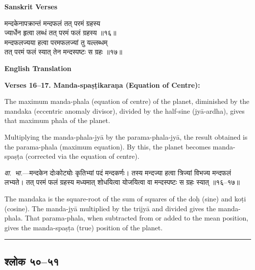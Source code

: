 \documentclass[11pt,a4paper]{article}
\newcommand{\longline}{\noindent\rule{\textwidth}{0.4pt}}
\newcommand{\dev}[1]{{\devanagarifont #1}}
\newcommand{\sectsep}{\par\vspace{0.8em}\longline\vspace{0.8em}}
\begin{document}
\begin{minipage}[t]{0.48\textwidth}
\textbf{\small Sanskrit Verses}

\small\devanagarifont
मन्दकेनापक्रान्तं मन्दफलं तत् परमं ग्रहस्य\\
ज्यार्धेन हृत्वा लब्धं तत् परमं फलं ग्रहस्य ॥१६॥\\[0.5em]
मन्दफलज्यया हत्वा परमफलज्यां तु यल्लब्धम्\\
तत् परमं फलं स्यात् तेन मन्दस्पष्टः स ग्रहः ॥१७॥
\end{minipage}%
\hfill
\begin{minipage}[t]{0.48\textwidth}
\textbf{\small English Translation}

\textbf{Verses 16--17. Manda-spa\d{s}\d{t}ikara\d{n}a (Equation of Centre):}

The maximum manda-phala (equation of centre) of the planet, diminished by the mandaka (eccentric anomaly divisor), divided by the half-sine (jy\=a-ardha), gives that maximum phala of the planet.

Multiplying the manda-phala-jy\=a by the parama-phala-jy\=a, the result obtained is the parama-phala (maximum equation). By this, the planet becomes manda-spa\d{s}\d{t}a (corrected via the equation of centre).
\end{minipage}

\vspace{0.5em}
\begin{minipage}[t]{0.48\textwidth}
\small\devanagarifont
\textit{वा.~भा.}---मन्दकेन दोःकोट्योः कृतिभ्यां पदं मन्दकर्णः। तस्य मन्दज्या हत्वा त्रिज्यां विभज्य मन्दफलं लभ्यते। तत् परमं फलं ग्रहस्य मध्यमात् शोधयित्वा योजयित्वा वा मन्दस्पष्टः स ग्रहः स्यात् ॥१६--१७॥
\end{minipage}%
\hfill
\begin{minipage}[t]{0.48\textwidth}
\small
The mandaka is the square-root of the sum of squares of the do\d{h} (sine) and ko\d{t}i (cosine). The manda-jy\=a multiplied by the trijy\=a and divided gives the manda-phala. That parama-phala, when subtracted from or added to the mean position, gives the manda-spa\d{s}\d{t}a (true) position of the planet.
\end{minipage}

\sectsep

\subsection{\dev{श्लोक ५०--५१}}
\end{document}

